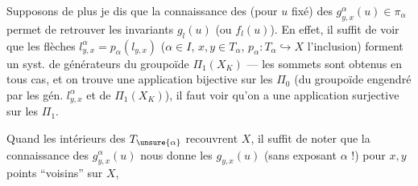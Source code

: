 
Supposons de plus    je dis que la connaissance des (pour $u$ fixé) des $g_{y,x}^\alpha(u)\in\pi_\alpha$  permet de retrouver  les invariants $g_l(u)$ (ou $f_l(u)$). En effet, il suffit de voir que les flèches $l_{y,x}^\alpha=p_\alpha(l_{y,x})$ ($\alpha\in I$, $x,y\in T_\alpha$, $p_\alpha:T_\alpha\hookrightarrow X$ l'inclusion)  forment un syst. de générateurs du groupoïde $\Pi_1(X_K)$ ---  les  sommets sont obtenus en tous cas, et on trouve une application bijective sur les $\Pi_0$ (du groupoïde engendré par les gén. $l_{y,x}^\alpha$  et de $\Pi_1(X_K)$), il faut voir qu'on a une application surjective sur les $\Pi_1$.

Quand les intérieurs des $T_{\unsure{\alpha}}$ recouvrent $X$, il suffit de noter que la connaissance des $g_{y,x}^{\alpha}(u)$ nous donne les $g_{y,x}(u)$ (sans exposant $\alpha$ !) pour $x,y$ points ``voisins'' sur $X$,
